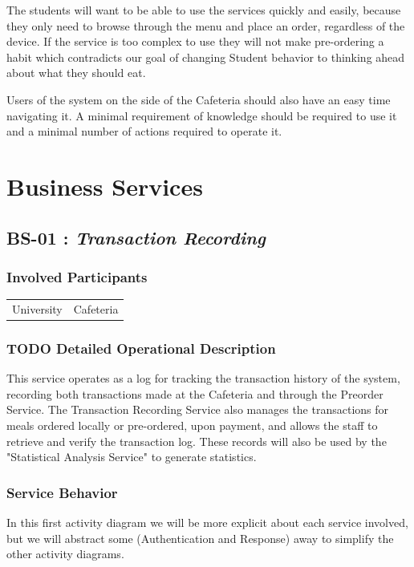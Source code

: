 \documentclass[11pt]{article}
\begin{document}
The students will want to be able to use the services quickly and
easily, because they only need to browse through the menu and place
an order, regardless of the device. If the service is too complex
to use they will not make pre-ordering a habit which contradicts
our goal of changing Student behavior to thinking ahead about what
they should eat.

Users of the system on the side of the Cafeteria should also have
an easy time navigating it. A minimal requirement of knowledge
should be required to use it and a minimal number of actions
required to operate it.
\section{Business Services}
\label{sec:org8abde7c}
\subsection{\label{org6197c20}BS-01 : \emph{Transaction Recording}}
\label{sec:org173962f}
\subsubsection{Involved Participants}
\label{sec:orge5c4e00}
\begin{center}
\begin{tabular}{ll}
University & Cafeteria\\
\end{tabular}
\end{center}
\subsubsection{{\bfseries\sffamily TODO} Detailed Operational Description}
\label{sec:org513fdf9}
This service operates as a log for tracking the transaction
history of the system, recording both transactions made at the
Cafeteria and through the Preorder Service. The Transaction
Recording Service also manages the transactions for meals ordered
locally or pre-ordered, upon payment, and allows the staff to
retrieve and verify the transaction log. These records will also
be used by the "Statistical Analysis Service" to generate
statistics.
\subsubsection{Service Behavior}
\label{sec:orgdc9129e}
In this first activity diagram we will be more explicit about each
service involved, but we will abstract some (Authentication and
Response) away to simplify the other activity diagrams.
\end{document}
